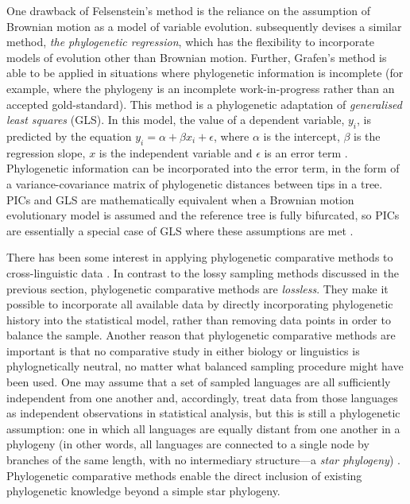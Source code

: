 One drawback of Felsenstein's method is the reliance on the assumption of Brownian motion as a model of variable evolution. \textcite{grafen_phylogenetic_1989} subsequently devises a similar method, \emph{the phylogenetic regression}, which has the flexibility to incorporate models of evolution other than Brownian motion. Further, Grafen's method is able to be applied in situations where phylogenetic information is incomplete (for example, where the phylogeny is an incomplete work-in-progress rather than an accepted gold-standard). This method is a phylogenetic adaptation of \emph{generalised least squares} (GLS). In this model, the value of a dependent variable, \(y_{i}\), is predicted by the equation \(y_{i} = \alpha + \beta x_{i} + \epsilon\), where \(\alpha\) is the intercept, \(\beta\) is the regression slope, \(x\) is the independent variable and \(\epsilon\) is an error term \autocite[p.~164]{nunn_comparative_2011}. Phylogenetic information can be incorporated into the error term, in the form of a variance-covariance matrix of phylogenetic distances between tips in a tree. PICs and GLS are mathematically equivalent when a Brownian motion evolutionary model is assumed and the reference tree is fully bifurcated, so PICs are essentially a special case of GLS where these assumptions are met \autocite{nunn_comparative_2011}.

There has been some interest in applying phylogenetic comparative methods to cross-linguistic data \autocites[for example,][]{dunn_evolved_2011}{maurits_tracing_2014}{verkerk_diachronic_2014}{birchall_comparison_2015}{zhou_quantifying_2015}{calude_typology_2016}{dunn_dative_2017}{verkerk_phylogenetic_2017}. In contrast to the lossy sampling methods discussed in the previous section, phylogenetic comparative methods are \emph{lossless}. They make it possible to incorporate all available data by directly incorporating phylogenetic history into the statistical model, rather than removing data points in order to balance the sample. Another reason that phylogenetic comparative methods are important is that no comparative study in either biology or linguistics is phylognetically neutral, no matter what balanced sampling procedure might have been used. One may assume that a set of sampled languages are all sufficiently independent from one another and, accordingly, treat data from those languages as independent observations in statistical analysis, but this is still a phylogenetic assumption: one in which all languages are equally distant from one another in a phylogeny (in other words, all languages are connected to a single node by branches of the same length, with no intermediary structure---a \emph{star phylogeny}) \autocite{purvis_polytomies_1993}. Phylogenetic comparative methods enable the direct inclusion of existing phylogenetic knowledge beyond a simple star phylogeny.

